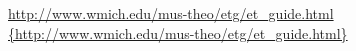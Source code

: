 \documentclass[11pt]{article}
\newcommand{\myurl}[1]{{\url{{#1}}}}
\begin{document}
\url{http://www.wmich.edu/mus-theo/etg/et_guide.html} %
\myurl{http://www.wmich.edu/mus-theo/etg/et_guide.html} %

\cite{THE}

\end{document}
